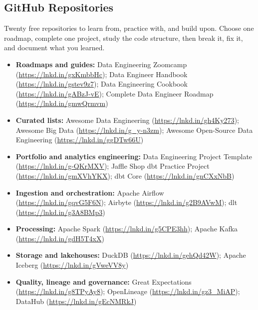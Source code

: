 \subsection*{GitHub Repositories}
Twenty free repositories to learn from, practice with, and build upon. Choose one roadmap, complete one project, study the code structure, then break it, fix it, and document what you learned.
\begin{itemize}
    \item \textbf{Roadmaps and guides:} Data Engineering Zoomcamp (\url{https://lnkd.in/gxKmbbHc}); Data Engineer Handbook (\url{https://lnkd.in/gstev9z7}); Data Engineering Cookbook (\url{https://lnkd.in/gABzJ-vE}); Complete Data Engineer Roadmap (\url{https://lnkd.in/gmwQrmvm})
    \item \textbf{Curated lists:} Awesome Data Engineering (\url{https://lnkd.in/gh4Ky273}); Awesome Big Data (\url{https://lnkd.in/g_y-n3zm}); Awesome Open-Source Data Engineering (\url{https://lnkd.in/ggDTw66U})
    \item \textbf{Portfolio and analytics engineering:} Data Engineering Project Template (\url{https://lnkd.in/g-QKrMXV}); Jaffle Shop dbt Practice Project (\url{https://lnkd.in/gmXVhYKX}); dbt Core (\url{https://lnkd.in/gnCXxNbB})
    \item \textbf{Ingestion and orchestration:} Apache Airflow (\url{https://lnkd.in/gqvG5F6N}); Airbyte (\url{https://lnkd.in/g2B9AVwM}); dlt (\url{https://lnkd.in/g3A8BMp3})
    \item \textbf{Processing:} Apache Spark (\url{https://lnkd.in/g5CPE3hh}); Apache Kafka (\url{https://lnkd.in/gdH5T4xX})
    \item \textbf{Storage and lakehouses:} DuckDB (\url{https://lnkd.in/gehQd42W}); Apache Iceberg (\url{https://lnkd.in/gVweVV8y})
    \item \textbf{Quality, lineage and governance:} Great Expectations (\url{https://lnkd.in/g8TPyAy8}); OpenLineage (\url{https://lnkd.in/gz3_MiAP}); DataHub (\url{https://lnkd.in/gEcNMRkJ})
\end{itemize}
